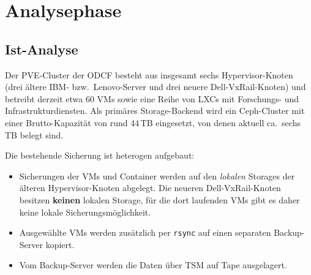 \section{Analysephase}
\label{sec:Analysephase}


\subsection{Ist-Analyse}
\label{sec:IstAnalyse}
Der \ac{PVE}-Cluster der \ac{ODCF} besteht aus insgesamt sechs
Hypervisor-Knoten (drei ältere IBM- bzw.\ Lenovo-Server und drei
neuere Dell-VxRail-Knoten) und betreibt derzeit etwa 60 \acp{VM}
sowie eine Reihe von \acp{LXC} mit Forschungs- und
Infrastrukturdiensten.
Als primäres Storage-Backend wird ein Ceph-Cluster mit einer
Brutto-Kapazität von rund 44\,TB eingesetzt, von denen aktuell ca.\
sechs\,TB belegt sind.

Die bestehende Sicherung ist heterogen aufgebaut:
\begin{itemize}
    \item Sicherungen der \acp{VM} und Container werden auf den
          \emph{lokalen} Storages der älteren Hypervisor-Knoten
          abgelegt. Die neueren Dell-VxRail-Knoten besitzen
          \textbf{keinen} lokalen Storage, für die dort laufenden
          \acp{VM} gibt es daher keine lokale Sicherungsmöglichkeit.
    \item Ausgewählte \acp{VM} werden zusätzlich per \texttt{rsync} auf
          einen separaten Backup-Server kopiert.
    \item Vom Backup-Server werden die Daten über \ac{TSM} auf Tape
          ausgelagert.
\end{itemize}

